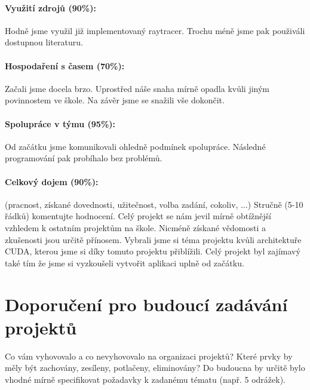 \documentclass[12pt,a4paper,titlepage,final]{report}
\begin{document}
\paragraph{Využití zdrojů (90\%):}
Hodně jsme využil již implementovaný raytracer. Trochu méně jsme pak použiváli dostupnou literaturu.

\paragraph{Hospodaření s časem (70\%):}
Začali jsme docela brzo. Uprostřed náše snaha mírně opadla kvůli jiným povinnostem ve škole. Na závěr jsme se snažili vše dokončit.

\paragraph{Spolupráce v týmu (95\%):}
Od začátku jsme komunikovali ohledně podmínek spolupráce. Následné programování pak probíhalo bez problémů.

\paragraph{Celkový dojem (90\%):} (pracnost, získané dovednosti, užitečnost,
volba zadání, cokoliv, $\ldots$)
Stručně (5-10 řádků) komentujte hodnocení.
Celý projekt se nám jevil mírně obtížnější vzhledem k ostatním projektům na škole. 
Nicméně získané vědomosti a zkušenosti jsou určitě přínosem. 
Vybrali jsme si téma projektu kvůli architektuře CUDA, kterou jsme si díky tomuto projektu přiblížili. 
Celý projekt byl zajímavý také tím že jsme si vyzkoušeli vytvořit aplikaci uplně od začátku. 
\section{Doporučení pro budoucí zadávání projektů}

Co vám vyhovovalo a co nevyhovovalo na organizaci projektů? Které prvky by měly
být zachovány, zesíleny, potlačeny, eliminovány?
Do budoucna by určitě bylo vhodné mírně specifikovat požadavky k zadanému tématu (např. 5 odrážek). 

\end{document}
